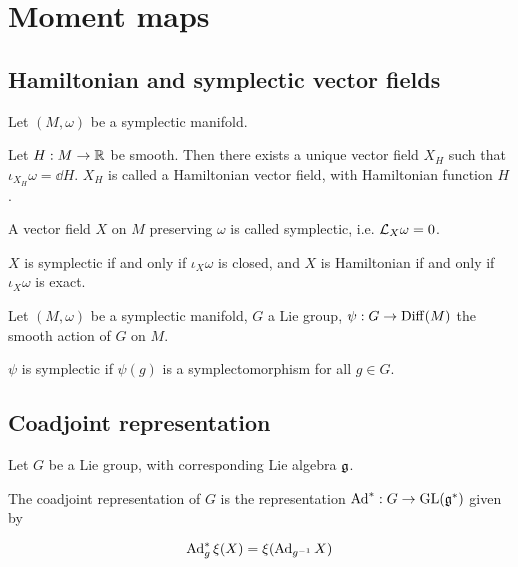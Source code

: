 \section{Moment maps}

\subsection{Hamiltonian and symplectic vector fields}

Let \((M, \omega)\) be a symplectic manifold.

\begin{definition}
     Let \(H : M \to \mathbb{R}\) be smooth. Then there exists a unique vector field \(X_H\) such that \(\iota_{X_H}\omega = \dd H\). \(X_H\) is called a Hamiltonian vector field, with Hamiltonian function \(H\).
\end{definition}

\begin{definition}
    A vector field \(X\) on \(M\) preserving \(\omega\) is called symplectic, i.e. \(\mathcal{L}_X\omega = 0\).
\end{definition}

\begin{proposition}
    \(X\) is symplectic if and only if \(\iota_X\omega\) is closed, and \(X\) is Hamiltonian if and only if \(\iota_X\omega\) is exact.
\end{proposition}

Let \((M, \omega)\) be a symplectic manifold, \(G\) a Lie group, \(\psi : G \to \operatorname{Diff}(M)\) the smooth action of \(G\) on \(M\).

\begin{definition}
     \(\psi\) is symplectic if \(\psi(g)\) is a symplectomorphism for all \(g \in G\).
\end{definition}

\subsection{Coadjoint representation}

Let \(G\) be a Lie group, with corresponding Lie algebra \(\mathfrak{g}\).

\begin{definition}
     The coadjoint representation of \(G\) is the representation \(\operatorname{Ad}^* : G \to \operatorname{GL}(\mathfrak{g}^*)\) given by

    \[\operatorname{Ad}_g^*\xi(X) = \xi(\operatorname{Ad}_{g^{-1}}X)\]
\end{definition}

